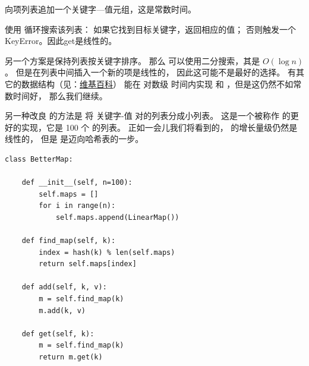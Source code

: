 
 向项列表追加一个关键字---值元组，这是常数时间。



 使用  循环搜索该列表： 如果它找到目标关键字，返回相应的值；
否则触发一个KeyError。因此get是线性的。


另一个方案是保持列表按关键字排序。
那么  可以使用二分搜索，其是 $O(\log n)$ 。
但是在列表中间插入一个新的项是线性的， 因此这可能不是最好的选择。
有其它的数据结构（见：\href{http://en.wikipedia.org/wiki/Red-black_tree}{维基百科}）
能在 对数级 时间内实现  和 ，但是这仍然不如常数时间好，
那么我们继续。



另一种改良  的方法是 将 关键字-值 对的列表分成小列表。
这是一个被称作  的更好的实现，它是 100 个  的列表。
正如一会儿我们将看到的， 的增长量级仍然是线性的，
但是  是迈向哈希表的一步。

\begin{lstlisting}
class BetterMap:

    def __init__(self, n=100):
        self.maps = []
        for i in range(n):
            self.maps.append(LinearMap())

    def find_map(self, k):
        index = hash(k) % len(self.maps)
        return self.maps[index]

    def add(self, k, v):
        m = self.find_map(k)
        m.add(k, v)

    def get(self, k):
        m = self.find_map(k)
        return m.get(k)
\end{lstlisting}

